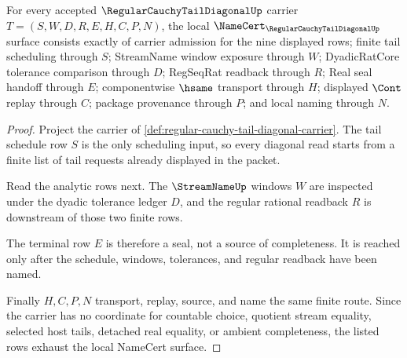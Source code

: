 \begin{theorem}
\label{thm:regular-cauchy-tail-diagonal-namecert-obligations}
For every accepted $\RegularCauchyTailDiagonalUp$ carrier $T=(S,W,D,R,E,H,C,P,N)$, the local $\NameCert_{\RegularCauchyTailDiagonalUp}$ surface consists exactly of carrier admission for the nine displayed rows; finite tail scheduling through $S$; StreamName window exposure through $W$; DyadicRatCore tolerance comparison through $D$; RegSeqRat readback through $R$; Real seal handoff through $E$; componentwise $\hsame$ transport through $H$; displayed $\Cont$ replay through $C$; package provenance through $P$; and local naming through $N$.
\end{theorem}
\begin{proof}
Project the carrier of \autoref{def:regular-cauchy-tail-diagonal-carrier}. The tail schedule row $S$ is the only scheduling input, so every diagonal read starts from a finite list of tail requests already displayed in the packet.

Read the analytic rows next. The $\StreamNameUp$ windows $W$ are inspected under the dyadic tolerance ledger $D$, and the regular rational readback $R$ is downstream of those two finite rows.

The terminal row $E$ is therefore a seal, not a source of completeness. It is reached only after the schedule, windows, tolerances, and regular readback have been named.

Finally $H,C,P,N$ transport, replay, source, and name the same finite route. Since the carrier has no coordinate for countable choice, quotient stream equality, selected host tails, detached real equality, or ambient completeness, the listed rows exhaust the local NameCert surface.
\end{proof}

